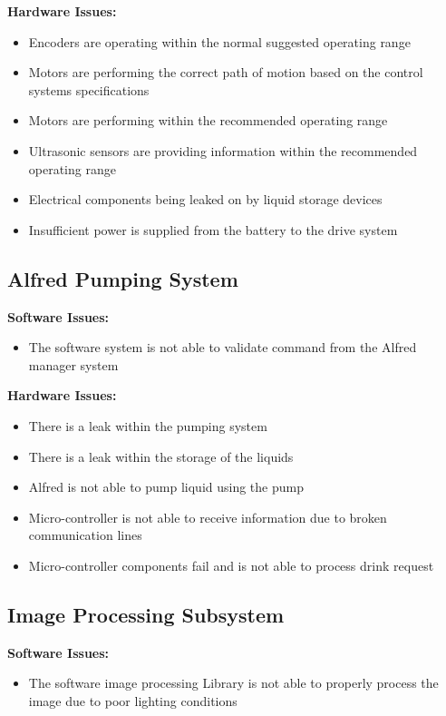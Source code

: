 \documentclass [10pt]{article}
\begin{document}
	\textbf{Hardware Issues:}
		\begin {itemize}
			\item Encoders are operating within the normal suggested operating range
			\item Motors are performing the correct path of motion based on the control systems specifications
			\item Motors are performing within the recommended operating range
			\item Ultrasonic sensors are providing information within the recommended operating range
			\item Electrical components being leaked on by liquid storage devices
			\item Insufficient power is supplied from the battery to the drive system
		\end {itemize}
\subsection{Alfred Pumping System}
	\textbf{Software Issues:}
		\begin {itemize}
			\item The software system is not able to validate command from the Alfred manager system
		\end {itemize}
		
	\textbf{Hardware Issues:}
		\begin {itemize}
			\item There is a leak within the pumping system
			\item There is a leak within the storage of the liquids
			\item Alfred is not able to pump liquid using the pump
			\item Micro-controller is not able to receive information due to broken communication lines
			\item Micro-controller components fail and is not able to process drink request
		\end {itemize}
\subsection{Image Processing Subsystem}
	\textbf{Software Issues:}
		\begin {itemize}
			\item The software image processing Library is not able to properly process the image due to poor lighting conditions
		\end {itemize}
		
\end{document}
